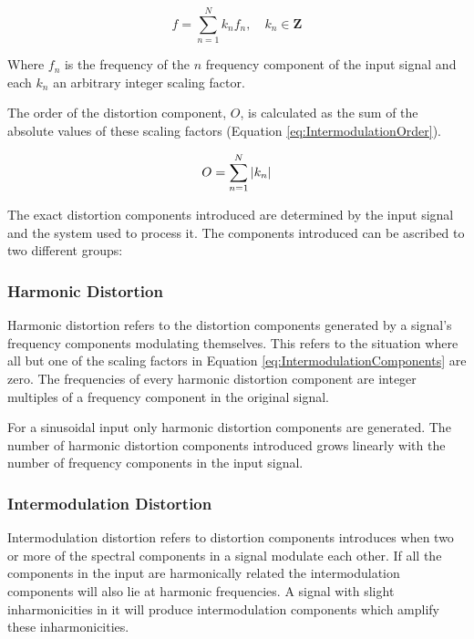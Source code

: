 		\begin{equation}
			f = \sum_{n = 1}^{N} k_{n}f_{n}, \quad k_{n} \in \textbf{Z}
			\label{eq:IntermodulationComponents}
		\end{equation}

		Where $f_{n}$ is the frequency of the $n$ frequency component of the input signal and each $k_{n}$
		an arbitrary integer scaling factor.

		The order of the distortion component, $O$, is calculated as the sum of the absolute values of these scaling
		factors (Equation \ref{eq:IntermodulationOrder}).

		\begin{equation}
			O = \sum_{n = 1}^{N} \left|k_{n}\right|
			\label{eq:IntermodulationOrder}
		\end{equation}

		The exact distortion components introduced are determined by the input signal and the system used to process
		it. The components introduced can be ascribed to two different groups:

		\subsubsection*{Harmonic Distortion}
			Harmonic distortion refers to the distortion components generated by a signal's frequency components
			modulating themselves. This refers to the situation where all but one of the scaling factors in
			Equation \ref{eq:IntermodulationComponents} are zero. The frequencies of every harmonic distortion
			component are integer multiples of a frequency component in the original signal. 
			
			For a sinusoidal input only harmonic distortion components are generated. The number of harmonic
			distortion components introduced grows linearly with the number of frequency components in the input
			signal.

		\subsubsection*{Intermodulation Distortion}
			Intermodulation distortion refers to distortion components introduces when two or more of the
			spectral components in a signal modulate each other. If all the components in the input are
			harmonically related the intermodulation components will also lie at harmonic frequencies. A signal
			with slight inharmonicities in it will produce intermodulation components which amplify these
			inharmonicities.


